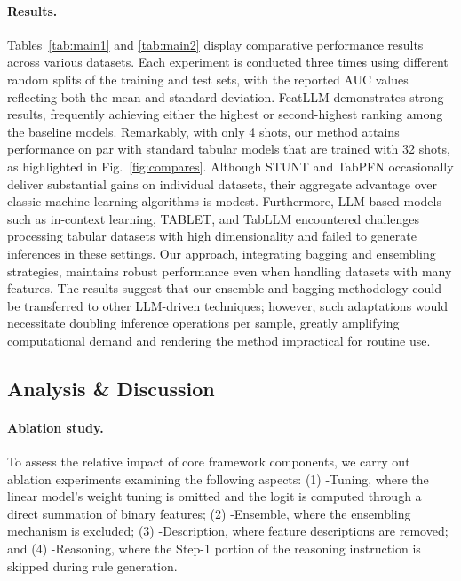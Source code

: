 \vspace*{-0.12in}
\paragraph{Results.}
Tables~\ref{tab:main1} and \ref{tab:main2} display comparative performance results across various datasets. Each experiment is conducted three times using different random splits of the training and test sets, with the reported AUC values reflecting both the mean and standard deviation. \textsf{FeatLLM} demonstrates strong results, frequently achieving either the highest or second-highest ranking among the baseline models. Remarkably, with only 4 shots, our method attains performance on par with standard tabular models that are trained with 32 shots, as highlighted in Fig.~\ref{fig:compares}. Although STUNT and TabPFN occasionally deliver substantial gains on individual datasets, their aggregate advantage over classic machine learning algorithms is modest. Furthermore, LLM-based models such as in-context learning, TABLET, and TabLLM encountered challenges processing tabular datasets with high dimensionality and failed to generate inferences in these settings. Our approach, integrating bagging and ensembling strategies, maintains robust performance even when handling datasets with many features. The results suggest that our ensemble and bagging methodology could be transferred to other LLM-driven techniques; however, such adaptations would necessitate doubling inference operations per sample, greatly amplifying computational demand and rendering the method impractical for routine use.

\subsection{Analysis \& Discussion}
\label{sec:analysis}
\paragraph{Ablation study.} To assess the relative impact of core framework components, we carry out ablation experiments examining the following aspects: (1) \textsf{-Tuning}, where the linear model's weight tuning is omitted and the logit is computed through a direct summation of binary features; (2) \textsf{-Ensemble}, where the ensembling mechanism is excluded; (3) \textsf{-Description}, where feature descriptions are removed; and (4) \textsf{-Reasoning}, where the Step-1 portion of the reasoning instruction is skipped during rule generation.

